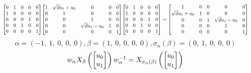 \documentclass[11pt]{article}
\theoremstyle{definition}
\begin{document}
\[
\scaletoalign{\textwidth}{{\left[\begin{matrix}0 & 1 & 0 & 0 & 0\\1 & 0 & 0 & 0 & 0\\0 & 0 & 0 & 1 & 0\\0 & 0 & 1 & 0 & 0\\0 & 0 & 0 & 0 & 1\end{matrix}\right]} {\left[\begin{matrix}1 & \sqrt{d} u_{1} + u_{0} & 0 & 0 & 0\\0 & 1 & 0 & 0 & 0\\0 & 0 & 1 & 0 & 0\\0 & 0 & \sqrt{d} u_{1} - u_{0} & 1 & 0\\0 & 0 & 0 & 0 & 1\end{matrix}\right]} {\left[\begin{matrix}0 & 1 & 0 & 0 & 0\\1 & 0 & 0 & 0 & 0\\0 & 0 & 0 & 1 & 0\\0 & 0 & 1 & 0 & 0\\0 & 0 & 0 & 0 & 1\end{matrix}\right]} = {\left[\begin{matrix}1 & 0 & 0 & 0 & 0\\\sqrt{d} u_{1} + u_{0} & 1 & 0 & 0 & 0\\0 & 0 & 1 & \sqrt{d} u_{1} - u_{0} & 0\\0 & 0 & 0 & 1 & 0\\0 & 0 & 0 & 0 & 1\end{matrix}\right]}}
\]
\[
\alpha = \left( -1, \  1, \  0, \  0, \  0\right), \beta = \left( 1, \  0, \  0, \  0, \  0\right), \sigma_{\alpha}(\beta) = \left( 0, \  1, \  0, \  0, \  0\right)
\]
\[
\scaletoalign{\textwidth}{w_{\alpha} X_{\beta}\left(\left[\begin{matrix}u_{0}\\u_{1}\end{matrix}\right]\right) w_{\alpha}^{-1} = X_{\sigma_{\alpha}\left(\beta\right)}\left(\left[\begin{matrix}u_{0}\\u_{1}\end{matrix}\right]\right)}
\]
\end{document}
